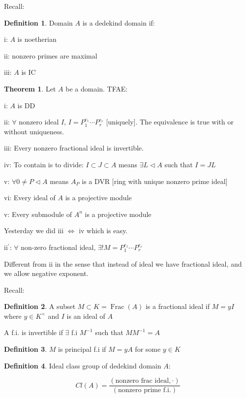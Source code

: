 \documentclass{article}
\theoremstyle{definition}
\newtheorem{definition}{Definition}
\newtheorem{theorem}{Theorem}
\newcommand{\Frac}{\operatorname{Frac}}
\begin{document}
Recall:

\begin{definition}
    Domain \(A\) is a dedekind domain if:

    i: \(A\) is noetherian

    ii: nonzero primes are maximal

    iii: \(A\) is IC
\end{definition}

\begin{theorem}
    Let \(A\) be a domain. TFAE:

    i: \(A\) is DD

    ii: \(\forall\) nonzero ideal \(I\), \(I= P_1^{e_1}\cdots P_r^{e_r}\) [uniquely]. The equivalence is true with or without uniqueness.
    
    iii: Every nonzero fractional ideal is invertible.

    iv: To contain is to divide: \(I \subset J \subset A\) means \(\exists L \triangleleft A\) such that \(I = JL\)   

    v: \(\forall 0 \neq P \triangleleft A\) means \(A_P\) is a DVR [ring with unique nonzero prime ideal]
    
    vi: Every ideal of \(A\) is a projective module

    v: Every submodule of \(A^n\) is a projective module
\end{theorem}

Yesterday we did iii \(\iff\) iv which is easy.

ii\(^{\prime} \): \(\forall\) non-zero fractional ideal, \(\exists ! M = P_1^{e_1}\cdots P_r^{e_r}\) 

Different from ii in the sense that instead of ideal we have fractional ideal, and we allow negative exponent.

Recall:

\begin{definition}
    A subset \(M \subset K = \Frac(A)\) is a fractional ideal if \(M = yI\) where \(y\in K^\times\) and \(I\) is an ideal of \(A\) 
\end{definition}

A f.i. is invertible if \(\exists\) f.i \(M ^{-1}\) such that \(M M ^{-1} = A\)

\begin{definition}
    \(M\) is principal f.i if \(M = yA\) for some \(y\in K\) 
\end{definition}

\begin{definition}
    Ideal class group of dedekind domain \(A\):

    \[
        Cl(A) = \frac{(\text{nonzero frac ideal},\cdot)}{(\text{nonzero prime f.i.})}
    \]
\end{definition}
\end{document}
